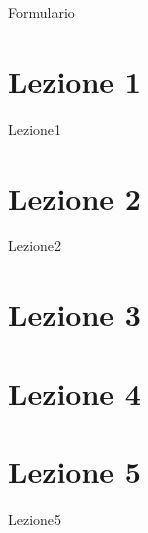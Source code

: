 \documentclass[openany,12pt]{article}
\begin{document}
{Formulario}

\newpage

\section{Lezione 1}
{Lezione1}

\newpage

\section{Lezione 2}
{Lezione2}

\newpage

\section{Lezione 3}

\newpage

\section{Lezione 4}

\newpage

\section{Lezione 5}
{Lezione5}
\end{document}

